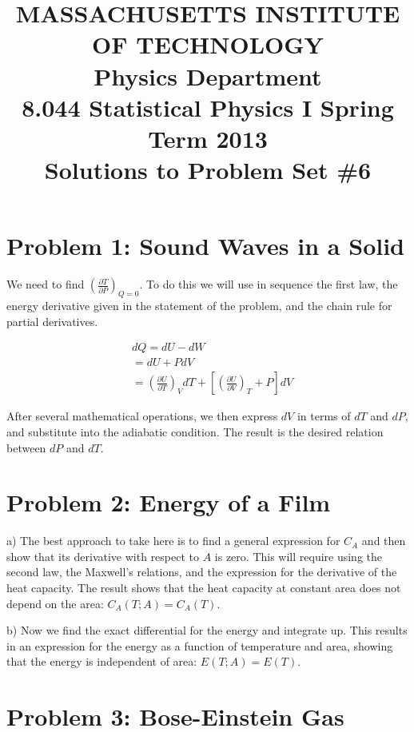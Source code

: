 \documentclass[12pt]{article}
\begin{document}
\title{MASSACHUSETTS INSTITUTE OF TECHNOLOGY \\
Physics Department \\
8.044 Statistical Physics I Spring Term 2013 \\
Solutions to Problem Set \#6}

\maketitle

\section*{Problem 1: Sound Waves in a Solid}

We need to find $\left(\frac{\partial T}{\partial P}\right)_{Q=0}$. To do this we will use in sequence the first law, the energy
derivative given in the statement of the problem, and the chain rule for partial derivatives.

\begin{align*}
&dQ = dU - dW \\ 
& = dU +PdV \\
& = \left(\frac{\partial U}{\partial T}\right)_V dT + \left[\left(\frac{\partial U}{\partial V}\right)_T + P\right]dV
\end{align*}

After several mathematical operations, we then express $dV$ in terms of $dT$ and $dP$, and substitute into the adiabatic condition. The result is the desired relation between $dP$ and $dT$. 

\section*{Problem 2: Energy of a Film}

a) The best approach to take here is to find a general expression for $C_A$ and then show that 
its derivative with respect to $A$ is zero. This will require using the second law, the Maxwell's relations, and the expression for the derivative of the heat capacity. The result shows that the heat capacity at constant area does not depend on the area: $C_A(T;A) = C_A(T)$.

b) Now we find the exact differential for the energy and integrate up. This results in an expression for the energy as a function of temperature and area, showing that the energy is independent of area: $E(T; A) = E(T)$.

\section*{Problem 3: Bose-Einstein Gas}
\end{document}
